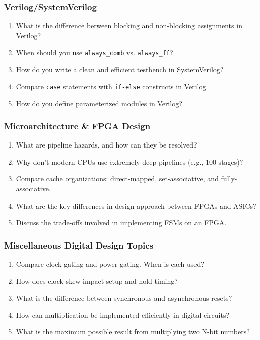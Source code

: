 \subsubsection*{Verilog/SystemVerilog}
\begin{enumerate}
    \item What is the difference between blocking and non-blocking assignments in Verilog?
    \item When should you use \texttt{always\_comb} vs. \texttt{always\_ff}?
    \item How do you write a clean and efficient testbench in SystemVerilog?
    \item Compare \texttt{case} statements with \texttt{if-else} constructs in Verilog.
    \item How do you define parameterized modules in Verilog?
\end{enumerate}

\subsubsection*{Microarchitecture \& FPGA Design}
\begin{enumerate}
    \item What are pipeline hazards, and how can they be resolved?
    \item Why don't modern CPUs use extremely deep pipelines (e.g., 100 stages)?
    \item Compare cache organizations: direct-mapped, set-associative, and fully-associative.
    \item What are the key differences in design approach between FPGAs and ASICs?
    \item Discuss the trade-offs involved in implementing FSMs on an FPGA.
\end{enumerate}

\subsubsection*{Miscellaneous Digital Design Topics}
\begin{enumerate}
    \item Compare clock gating and power gating. When is each used?
    \item How does clock skew impact setup and hold timing?
    \item What is the difference between synchronous and asynchronous resets?
    \item How can multiplication be implemented efficiently in digital circuits?
    \item What is the maximum possible result from multiplying two N-bit numbers?
\end{enumerate}

